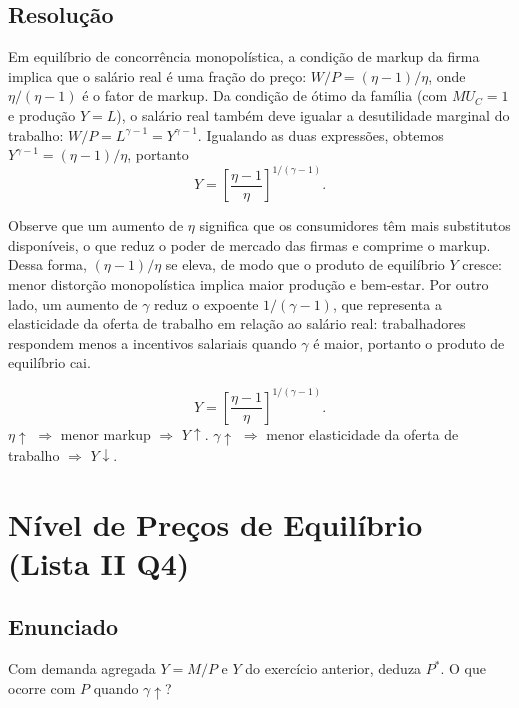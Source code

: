 \documentclass[12pt, a4paper]{article}
\begin{document}
\subsection*{Resolução}

Em equilíbrio de concorrência monopolística, a condição de markup da firma implica que o salário real é uma fração do preço: $W/P = (\eta-1)/\eta$, onde $\eta/(\eta-1)$ é o fator de markup. Da condição de ótimo da família (com $MU_C = 1$ e produção $Y = L$), o salário real também deve igualar a desutilidade marginal do trabalho: $W/P = L^{\gamma-1} = Y^{\gamma-1}$. Igualando as duas expressões, obtemos $Y^{\gamma-1} = (\eta-1)/\eta$, portanto
\[
Y = \left[\frac{\eta-1}{\eta}\right]^{1/(\gamma-1)}.
\]

Observe que um aumento de $\eta$ significa que os consumidores têm mais substitutos disponíveis, o que reduz o poder de mercado das firmas e comprime o markup. Dessa forma, $(\eta-1)/\eta$ se eleva, de modo que o produto de equilíbrio $Y$ cresce: menor distorção monopolística implica maior produção e bem-estar. Por outro lado, um aumento de $\gamma$ reduz o expoente $1/(\gamma-1)$, que representa a elasticidade da oferta de trabalho em relação ao salário real: trabalhadores respondem menos a incentivos salariais quando $\gamma$ é maior, portanto o produto de equilíbrio cai.

\begin{resultbox}[title={Produto de Equilíbrio com Concorrência Monopolística (Lista II Q3)}]
\[
Y = \left[\frac{\eta-1}{\eta}\right]^{1/(\gamma-1)}.
\]
$\eta\uparrow$ $\Rightarrow$ menor markup $\Rightarrow$ $Y\uparrow$. \quad $\gamma\uparrow$ $\Rightarrow$ menor elasticidade da oferta de trabalho $\Rightarrow$ $Y\downarrow$.
\end{resultbox}

\section{Nível de Preços de Equilíbrio (Lista II Q4)}

\subsection*{Enunciado}
Com demanda agregada $Y = M/P$ e $Y$ do exercício anterior, deduza $P^*$. O que ocorre com $P$ quando $\gamma\uparrow$?
\end{document}
